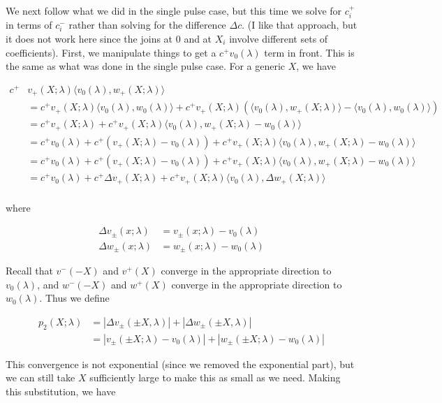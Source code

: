 \documentclass[12pt]{article}
\begin{document}
\begin{enumerate}
We next follow what we did in the single pulse case, but this time we solve for $c_i^+$ in terms of $c_i^-$ rather than solving for the difference $\Delta c$. (I like that approach, but it does not work here since the joins at 0 and at $X_i$ involve different sets of coefficients). First, we manipulate things to get a $c^+ v_0(\lambda)$ term in front. This is the same as what was done in the single pulse case. For a generic $X$, we have

\begin{align*}
c^+ &v_+(X; \lambda)\langle v_0(\lambda), w_+(X; \lambda) \rangle \\
&= c^+ v_+(X; \lambda)\langle v_0(\lambda), w_0(\lambda) \rangle + c^+ v_+(X; \lambda)( \langle v_0(\lambda), w_+(X; \lambda) \rangle - \langle v_0(\lambda), w_0(\lambda) \rangle )\\
&= c^+ v_+(X; \lambda) + c^+ v_+(X; \lambda) \langle v_0(\lambda), w_+(X; \lambda) - w_0(\lambda) \rangle \\
&= c^+ v_0(\lambda) + c^+( v_+(X; \lambda) - v_0(\lambda)) + c^+ v_+(X; \lambda) \langle v_0(\lambda), w_+(X; \lambda) - w_0(\lambda) \rangle \\
&= c^+ v_0(\lambda) + c^+( v_+(X; \lambda) - v_0(\lambda)) + c^+ v_+(X; \lambda) \langle v_0(\lambda), w_+(X; \lambda) - w_0(\lambda) \rangle \\
&= c^+ v_0(\lambda) + c^+ \Delta v_+(X; \lambda) + c^+ v_+(X; \lambda) \langle v_0(\lambda), \Delta w_+(X; \lambda) \rangle \\
\end{align*}

where

\begin{align*}
\Delta v_\pm(x; \lambda) &= v_\pm(x; \lambda) - v_0(\lambda) \\
\Delta w_\pm(x; \lambda) &= w_\pm(x; \lambda) - w_0(\lambda)
\end{align*}

Recall that $v^-(-X)$ and $v^+(X)$ converge in the appropriate direction to $v_0(\lambda)$, and $w^-(-X)$ and $w^+(X)$ converge in the appropriate direction to $w_0(\lambda)$. Thus we define

\begin{align*}
p_2(X; \lambda) &= |\Delta v_\pm(\pm X, \lambda)| + |\Delta w_\pm(\pm X, \lambda)|\\
&= |v_\pm(\pm X; \lambda) - v_0(\lambda)| + |w_\pm(\pm X; \lambda) - w_0(\lambda)|
\end{align*}

This convergence is not exponential (since we removed the exponential part), but we can still take $X$ sufficiently large to make this as small as we need. Making this substitution, we have


\end{enumerate}
\end{document}
